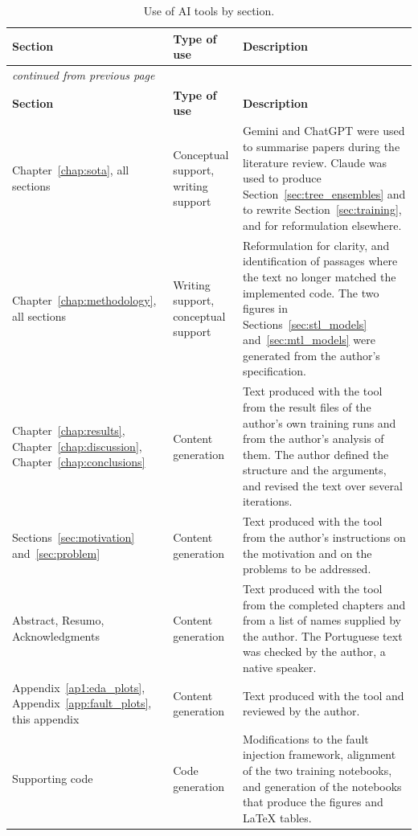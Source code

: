 \begin{longtable}{p{3.4cm}p{3.0cm}p{7.3cm}}
\caption{Use of AI tools by section.}
\label{tab:ai_by_section} \\
\hline
\textbf{Section} & \textbf{Type of use} & \textbf{Description} \\
\hline
\endfirsthead
\multicolumn{3}{l}{\small\emph{continued from previous page}} \\
\hline
\textbf{Section} & \textbf{Type of use} & \textbf{Description} \\
\hline
\endhead
\hline
\endfoot

Chapter~\ref{chap:sota}, all sections & Conceptual support, writing support & Gemini and ChatGPT were used
to summarise papers during the literature review. Claude was used to produce
Section~\ref{sec:tree_ensembles} and to rewrite Section~\ref{sec:training}, and for reformulation
elsewhere. \\

Chapter~\ref{chap:methodology}, all sections & Writing support, conceptual support & Reformulation for
clarity, and identification of passages where the text no longer matched the implemented code. The two
figures in Sections~\ref{sec:stl_models} and~\ref{sec:mtl_models} were generated from the author's
specification. \\

Chapter~\ref{chap:results}, Chapter~\ref{chap:discussion}, Chapter~\ref{chap:conclusions} & Content
generation & Text produced with the tool from the result files of the
author's own training runs and from the author's analysis of them. The author defined the structure and
the arguments, and revised the text over several iterations. \\

Sections~\ref{sec:motivation} and~\ref{sec:problem} & Content generation & Text produced with the tool from the
author's instructions on the motivation and on the problems to be addressed. \\

Abstract, Resumo, Acknowledgments & Content generation & Text produced with the tool from the completed chapters and
from a list of names supplied by the author. The Portuguese text was checked by the author, a native speaker. \\

Appendix~\ref{ap1:eda_plots}, Appendix~\ref{app:fault_plots}, this appendix & Content generation &
Text produced with the tool and reviewed by the author. \\

Supporting code & Code generation & Modifications to the fault injection framework, alignment of the two
training notebooks, and generation of the notebooks that produce the figures and LaTeX tables. \\
\end{longtable}

